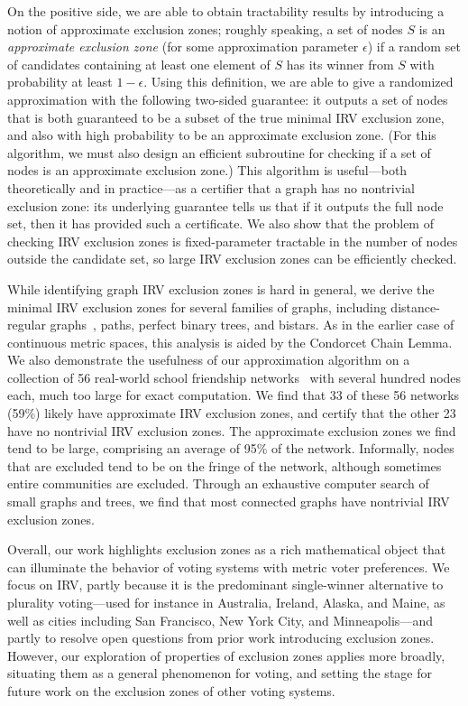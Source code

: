 \documentclass{article}
\theoremstyle{theorem}
\theoremstyle{definition}
\begin{document}
On the positive side, we are able to obtain tractability results by introducing a notion of approximate exclusion zones; roughly speaking, a set of nodes $S$ is an \emph{approximate exclusion zone} (for some approximation parameter $\epsilon$) if a random set of candidates containing at least one element of $S$ has its winner from $S$ with probability at least $1 - \epsilon$.   Using this definition, we are able to give a randomized approximation with the following two-sided guarantee: it outputs a set of nodes that is both guaranteed to be a subset of the true minimal IRV exclusion zone, and also with high probability to be an approximate exclusion zone.  (For this algorithm, we must also design an efficient subroutine for checking if a set of nodes is an approximate exclusion zone.)  This algorithm is useful---both theoretically and in practice---as a certifier that a graph has no nontrivial exclusion zone: its underlying guarantee tells us that if it outputs the full node set, then it has provided such a certificate. We also show that the problem of checking IRV exclusion zones is fixed-parameter tractable in the number of nodes outside the candidate set, so large IRV exclusion zones can be efficiently checked. 

While identifying graph IRV exclusion zones is hard in general, we derive the minimal IRV exclusion zones for several families of graphs, including distance-regular graphs~\cite{van2016distance}, paths, perfect binary trees, and bistars. As in the earlier case of continuous metric spaces, this analysis is aided by the Condorcet Chain Lemma. We also demonstrate the usefulness of our approximation algorithm on a collection of 56 real-world school friendship networks~\cite{paluck2016changing} with several hundred nodes each, much too large for exact computation. We find that 33 of these 56 networks (59\%) likely have approximate IRV exclusion zones, and certify that the other 23 have no nontrivial IRV exclusion zones. The approximate exclusion zones we find tend to be large, comprising an average of 95\% of the network. Informally, nodes that are excluded tend to be on the fringe of the network, although sometimes entire communities are excluded. Through an exhaustive computer search of small graphs and trees, we find that most connected graphs have nontrivial IRV exclusion zones. 

Overall, our work highlights exclusion zones as a rich mathematical object that can illuminate the behavior of voting systems with metric voter preferences. We focus on IRV, partly because it is the predominant single-winner alternative to plurality voting---used for instance in Australia, Ireland, Alaska, and Maine, as well as cities including San Francisco, New York City, and Minneapolis---and partly to resolve open questions from prior work introducing exclusion zones. However, our exploration of properties of exclusion zones applies more broadly, situating them as a general phenomenon for voting, and setting the stage for future work on the exclusion zones of other voting systems.
\end{document}

